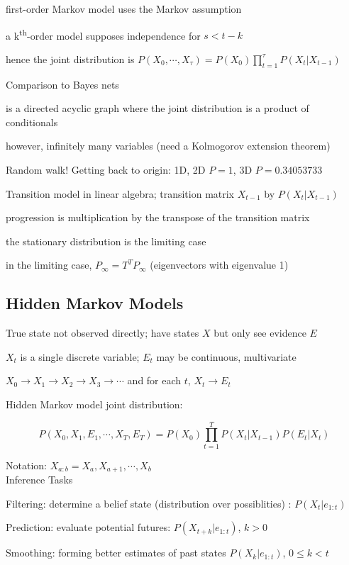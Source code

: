 \documentclass[12pt]{article}
\begin{document}
first-order Markov model uses the Markov assumption

a k\textsuperscript{th}-order model supposes independence for $s < t - k$

hence the joint distribution is $P(X_0, \cdots, X_{\tau}) = P(X_0) \prod_{t=1}^{\tau} P(X_t | X_{t - 1})$

\noindent
Comparison to Bayes nets

is a directed acyclic graph where the joint distribution is a product of conditionals

however, infinitely many variables (need a Kolmogorov extension theorem)

Random walk! Getting back to origin: 1D, 2D $P = 1$, 3D $P = 0.34053733$

\noindent
Transition model in linear algebra; transition matrix $X_{t-1}$ by $P(X_t|X_{t-1})$

progression is multiplication by the transpose of the transition matrix

the stationary distribution is the limiting case

in the limiting case, $P_{\infty} = T^TP_{\infty}$ (eigenvectors with eigenvalue 1)

\subsection{Hidden Markov Models}

\noindent
True state not observed directly; have states $X$ but only see evidence $E$

$X_t$ is a single discrete variable; $E_t$ may be continuous, multivariate

$X_0 \to X_1 \to X_2 \to X_3 \to \cdots$ and for each $t$, $X_t \to E_t$

Hidden Markov model joint distribution:

$$P(X_0, X_1, E_1, \cdots, X_T, E_T) = P(X_0)\prod_{t = 1}^TP(X_t|X_{t- 1}) P(E_t|X_t)$$

Notation: $X_{a:b} = X_a, X_{a + 1}, \cdots, X_b$\\

\noindent
Inference Tasks

Filtering: determine a belief state (distribution over possiblities) : $P(X_t|e_{1:t})$

Prediction: evaluate potential futures: $P(X_{t + k}|e_{1:t})$, $k>0$

Smoothing: forming better estimates of past states $P(X_k|e_{1:t})$, $0 \leq k < t$
\end{document}

